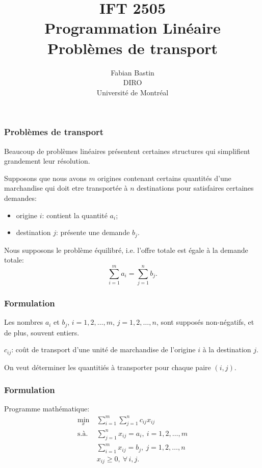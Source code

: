 \documentclass[usepdftitle=false]{beamer}
\title[IFT2505]{IFT 2505\\Programmation Linéaire\\Problèmes de transport}
\author[Fabian Bastin]{Fabian Bastin\\DIRO\\Université de Montréal}
\date{}
\begin{document}
\frame{\titlepage}


\begin{frame}
\frametitle{Problèmes de transport}

Beaucoup de problèmes linéaires présentent certaines structures qui simplifient grandement leur résolution.

\mbox{}

Supposons que nous avons $m$ origines contenant certains quantités d'une marchandise qui doit etre transportée à $n$ destinations pour satisfaires certaines demandes:
\begin{itemize}
\item
origine $i$: contient la quantité $a_i$;
\item
destination $j$: présente une demande $b_j$.
\end{itemize}

\mbox{}

Nous supposons le problème équilibré, i.e. l'offre totale est égale à la demande totale:
\[
\sum_{i = 1}^m a_i = \sum_{j = 1}^n b_j.
\]

\end{frame}

\begin{frame}
\frametitle{Formulation}

Les nombres $a_i$ et $b_j$, $i = 1,2,\ldots,m$, $j = 1,2,\ldots,n$, sont supposés non-négatifs, et de plus, souvent entiers.

\mbox{}

$c_{ij}$: coût de transport d'une unité de marchandise de l'origine $i$ à la destination $j$.

\mbox{}

On veut déterminer les quantitiés à transporter pour chaque paire $(i,j)$.

\end{frame}

\begin{frame}
\frametitle{Formulation}

Programme mathématique:
\begin{align*}
\min_x \ & \sum_{i = 1}^m \sum_{j = 1}^n c_{ij} x_{ij} \\
\mbox{s.à. } & \sum_{j = 1}^n x_{ij} = a_i, \ i = 1,2,\ldots,m \\
& \sum_{i = 1}^m x_{ij} = b_j,\ j = 1,2,\ldots,n \\
& x_{ij} \geq 0,\ \forall\, i, j.
\end{align*}

\end{frame}
\end{document}
